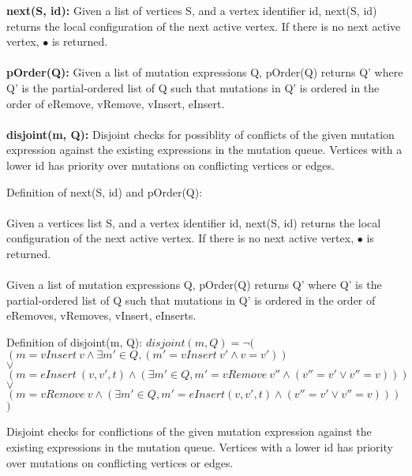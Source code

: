 \begin{frame}
\begin{small}
\textbf{next(S, id):} Given a list of vertices S, and a vertex identifier id, next(S, id) returns the local configuration of the next active vertex. If there is no next active vertex, $\bullet$ is returned.\\ 
\ \\
\textbf{pOrder(Q):} Given a list of mutation expressions Q, pOrder(Q) returns Q' where Q' is the partial-ordered list of Q such that mutations in Q' is ordered in the order of eRemove, vRemove, vInsert, eInsert.\\
\ \\
\textbf{disjoint(m, Q):} Disjoint checks for possiblity of conflicts of the given mutation expression against the existing expressions in the mutation queue. Vertices with a lower id has priority over mutations on conflicting vertices or edges.
\end{small}
\end{frame}

\begin{frame}
\begin{small}
Definition of next(S, id) and pOrder(Q):\\
\ \\
Given a vertices list S, and a vertex identifier id, next(S, id) returns the local configuration
of the next active vertex. If there is no next active vertex, $\bullet$ is returned.\\ 
\ \\
Given a list of mutation expressions Q, pOrder(Q) returns Q' where Q' is the partial-ordered list 
of Q such that mutations in Q' is ordered in the order of eRemoves, vRemoves, vInsert, eInserts.
\end{small}

\end{frame}

\begin{frame}
\begin{tiny}
Definition of disjoint(m, Q): 
$disjoint(m, Q) = \neg($\\
$(m = vInsert\ v \wedge \exists m' \in Q, (m' = vInsert\ v'\wedge v=v'))$\\
$\vee $\\
$(m = eInsert\ (v, v', t) \wedge (\exists m' \in Q, m' = vRemove\ v'' \wedge (v''=v'\vee v'' = v)))$\\
$\vee $\\
$(m = vRemove\ v \wedge (\exists m' \in Q, m' = eInsert (v, v', t) \wedge (v''=v'\vee v'' = v)))$\\
$)$ 

Disjoint checks for conflictions of the given mutation expression against the existing expressions in the mutation queue.
Vertices with a lower id has priority over mutations on conflicting vertices or edges.
\end{tiny}
\end{frame}

